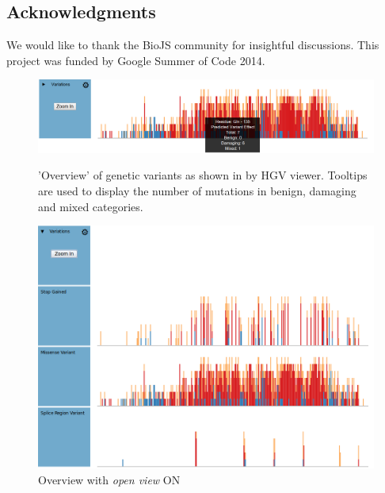 \documentclass[twoside]{article}
\begin{document}
\begin{multicols}{2}


\section{Acknowledgments}
We would like to thank the BioJS community for insightful discussions. This project was funded by Google Summer of Code 2014.




\begin{figure}
\includegraphics[width=\linewidth]{images/overview_withtooltip}
\label{overviewtooltip}
\caption{'Overview' of genetic variants as shown in by HGV viewer. Tooltips are used to display the number of mutations in benign, damaging and mixed categories.}
\end{figure}
\begin{figure}

\includegraphics[width=\linewidth]{images/openview}
\caption{Overview with \textit{open view} ON}
\label{openview}
\end{figure}


\end{multicols}
\end{document}
